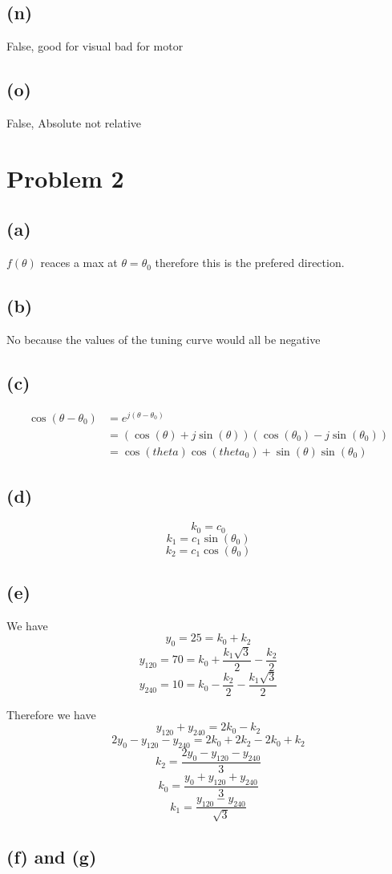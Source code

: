 \documentclass[12pt]{article}
\begin{document}
\subsection*{(n)}
False, good for visual bad for motor
\subsection*{(o)}
False, Absolute not relative


\section*{Problem 2}
\subsection*{(a)}
$f(\theta)$ reaces a max at $\theta=\theta_0$ therefore this
is the prefered direction.
\subsection*{(b)}
No because the values of the tuning curve would all be negative
\subsection*{(c)}
\begin{align*}
    \cos(\theta-\theta_0)&=e^{j(\theta-\theta_0)}\\
    &=(\cos(\theta)+j\sin(\theta))(\cos(\theta_0)-j\sin(\theta_0))\\
    &=\cos(theta)\cos(theta_0)+\sin(\theta)\sin(\theta_0)
\end{align*}
\subsection*{(d)}
$$k_0=c_0$$
$$k_1=c_1\sin(\theta_0)$$
$$k_2=c_1\cos(\theta_0)$$
\subsection*{(e)}
We have
$$y_0=25=k_0+k_2$$
$$y_{120}=70=k_0+\frac{k_1\sqrt{3}}{2}-\frac{k_2}{2}$$
$$y_{240}=10=k_0-\frac{k_2}{2}-\frac{k_1\sqrt{3}}{2}$$

Therefore we have
$$y_{120}+y_{240}=2k_0-k_2$$
$$2y_0-y_{120}-y_{240}=2k_0+2k_2-2k_0+k_2$$
$$k_2=\boxed{\frac{2y_0-y_{120}-y_{240}}{3}}$$
$$k_0=\boxed{\frac{y_0+y_{120}+y_{240}}{3}}$$
$$k_1=\boxed{\frac{y_{120}-y_{240}}{\sqrt{3}}}$$
\subsection*{(f) and (g)}

\end{document}
